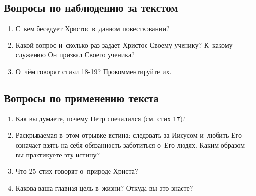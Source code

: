 \documentclass[a4paper,12pt]{article}
\begin{document}
\subsection*{Вопросы по наблюдению за текстом}
\begin{enumerate}
    \item С~кем беседует Христос в~данном повествовании? 
    
    \myline
    
    \myline
    \item Какой вопрос и~сколько раз задает Христос Своему ученику? К~какому служению Он призвал Своего ученика? 
    
    \myline
    
    \myline
    \item О~чём говорят стихи 18-19? Прокомментируйте их. 
    
    \myline
    
    \myline
\end{enumerate}

\subsection*{Вопросы по применению текста} 
\begin{enumerate}
    \item Как вы думаете, почему Петр опечалился (см. стих 17)?
    
    \myline
    
    \myline
    \item Раскрываемая в~этом отрывке истина: следовать за Иисусом и~любить Его~--- означает взять на себя обязанность заботиться о~Его людях. Каким образом вы практикуете эту истину? 
    
    \myline
    
    \myline
    \item Что 25~стих говорит о~природе Христа? 
    
    \myline
    
    \myline
    
    \item Какова ваша главная цель в~жизни? Откуда вы это знаете? 
    
    \myline
    
    \myline
\end{enumerate}
\end{document}
